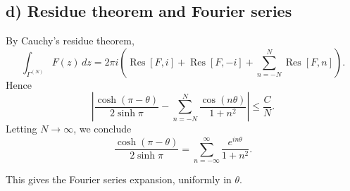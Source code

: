 \documentclass[11pt,a4paper]{article}
\begin{document}
\subsection*{d) Residue theorem and Fourier series}
By Cauchy's residue theorem,
\[
\int_{\Gamma^{(N)}} F(z)\,dz
= 2\pi i \left( \operatorname{Res}[F,i]+\operatorname{Res}[F,-i] + \sum_{n=-N}^N \operatorname{Res}[F,n]\right).
\]
Hence
\[
\left| \frac{\cosh(\pi-\theta)}{2\sinh \pi}
- \sum_{n=-N}^N \frac{\cos(n\theta)}{1+n^2} \right| \leq \frac{C}{N}.
\]
Letting $N\to\infty$, we conclude
\[
\frac{\cosh(\pi-\theta)}{2\sinh \pi}
= \sum_{n=-\infty}^\infty \frac{e^{in\theta}}{1+n^2}.
\]

This gives the Fourier series expansion, uniformly in $\theta$.
\end{document}
